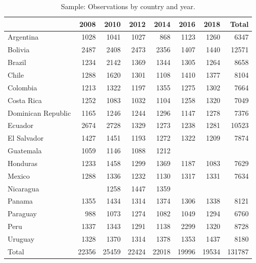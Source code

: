 \documentclass[utf8]{frontiers_suppmat} %
\begin{document}
\onecolumn
{}

\title[Supplementary Material]{{}}

\maketitle



\begin{table}[h]
\centering
	\caption{Sample: Observations by country and year.}
	\label{appendix1}
	\renewcommand{\arraystretch}{0.8}
    \begin{tabular}{lrrrrrrr}
     \toprule
     & 2008 & 2010 & 2012 & 2014 & 2016 & 2018 & Total \\
		\midrule
		Argentina & 1028 & 1041 & 1027 & 868 & 1123 & 1260 & 6347 \\
		Bolivia & 2487 & 2408 & 2473 & 2356 & 1407 & 1440 & 12571 \\
		Brazil & 1234 & 2142 & 1369 & 1344 & 1305 & 1264 & 8658 \\
		Chile & 1288 & 1620 & 1301 & 1108 & 1410 & 1377 & 8104 \\
		Colombia & 1213 & 1322 & 1197 & 1355 & 1275 & 1302 & 7664 \\
		Costa Rica & 1252 & 1083 & 1032 & 1104 & 1258 & 1320 & 7049 \\
		Dominican Republic & 1165 & 1246 & 1244 & 1296 & 1147 & 1278 & 7376 \\
		Ecuador & 2674 & 2728 & 1329 & 1273 & 1238 & 1281 & 10523 \\
		El Salvador & 1427 & 1451 & 1193 & 1272 & 1322 & 1209 & 7874 \\
		Guatemala & 1059 & 1146 & 1088 & 1212 &  &  &  \\
		Honduras & 1233 & 1458 & 1299 & 1369 & 1187 & 1083 & 7629 \\
		Mexico & 1288 & 1336 & 1232 & 1130 & 1317 & 1331 & 7634 \\
		Nicaragua &  & 1258 & 1447 & 1359 &  &  &  \\
		Panama & 1355 & 1434 & 1314 & 1374 & 1306 & 1338 & 8121 \\
		Paraguay & 988 & 1073 & 1274 & 1082 & 1049 & 1294 & 6760 \\
		Peru & 1337 & 1343 & 1291 & 1138 & 2299 & 1320 & 8728 \\
		Uruguay & 1328 & 1370 & 1314 & 1378 & 1353 & 1437 & 8180 \\
		Total & 22356 & 25459 & 22424 & 22018 & 19996 & 19534 & 131787 \\
		\bottomrule
	\end{tabular}
\end{table}
\end{document}
